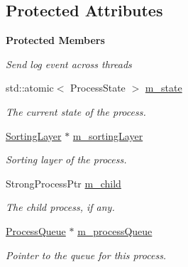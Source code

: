 \subsection*{Protected Attributes}
\begin{Indent}\textbf{ Protected Members}\par
{\em Send log event across threads }\begin{DoxyCompactItemize}
\item 
\mbox{\label{classrev_1_1_process_a62f250285ee09ca3854ad665232c1bb0}} 
std\+::atomic$<$ Process\+State $>$ \mbox{\hyperlink{classrev_1_1_process_a62f250285ee09ca3854ad665232c1bb0}{m\+\_\+state}}
\begin{DoxyCompactList}\small\item\em The current state of the process. \end{DoxyCompactList}\item 
\mbox{\label{classrev_1_1_process_a3981a9c113260e3a67ccaed3ce988ed9}} 
\mbox{\hyperlink{structrev_1_1_sorting_layer}{Sorting\+Layer}} $\ast$ \mbox{\hyperlink{classrev_1_1_process_a3981a9c113260e3a67ccaed3ce988ed9}{m\+\_\+sorting\+Layer}}
\begin{DoxyCompactList}\small\item\em Sorting layer of the process. \end{DoxyCompactList}\item 
\mbox{\label{classrev_1_1_process_a2429e021e2c1cb32b894fb352ffe7428}} 
Strong\+Process\+Ptr \mbox{\hyperlink{classrev_1_1_process_a2429e021e2c1cb32b894fb352ffe7428}{m\+\_\+child}}
\begin{DoxyCompactList}\small\item\em The child process, if any. \end{DoxyCompactList}\item 
\mbox{\label{classrev_1_1_process_a039d10f94bb8040ac6fef16643853438}} 
\mbox{\hyperlink{classrev_1_1_process_queue}{Process\+Queue}} $\ast$ \mbox{\hyperlink{classrev_1_1_process_a039d10f94bb8040ac6fef16643853438}{m\+\_\+process\+Queue}}
\begin{DoxyCompactList}\small\item\em Pointer to the queue for this process. \end{DoxyCompactList}\end{DoxyCompactItemize}
\end{Indent}
